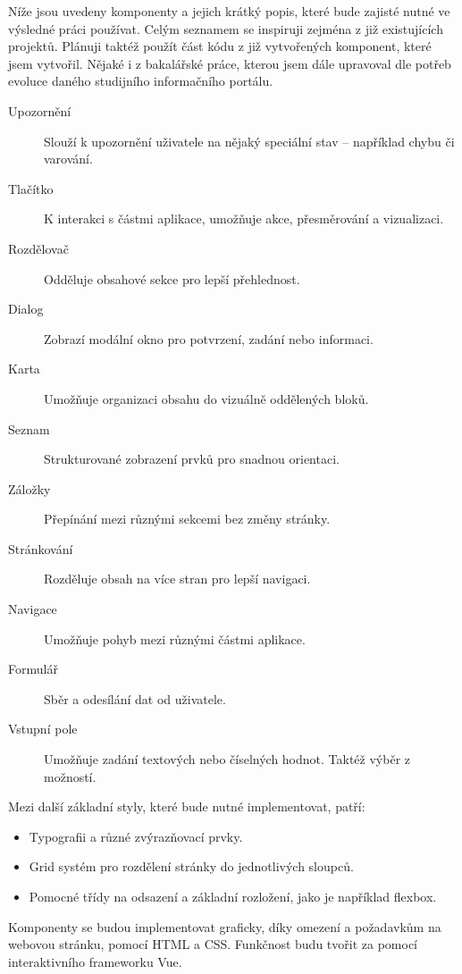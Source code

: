 Níže jsou uvedeny komponenty a jejich krátký popis, které bude zajisté nutné ve výsledné práci používat.
Celým seznamem se inspiruji zejména z již existujících projektů.
Plánuji taktéž použít část kódu z již vytvořených komponent, které jsem vytvořil.
Nějaké i z bakalářské práce, kterou jsem dále upravoval dle potřeb evoluce daného studijního informačního portálu. 

\begin{description} 
    \item[Upozornění] Slouží k upozornění uživatele na nějaký speciální stav – například chybu či varování. 
    \item[Tlačítko] K interakci s částmi aplikace, umožňuje akce, přesměrování a vizualizaci. 
    \item[Rozdělovač] Odděluje obsahové sekce pro lepší přehlednost. 
    \item[Dialog] Zobrazí modální okno pro potvrzení, zadání nebo informaci. 
    \item[Karta] Umožňuje organizaci obsahu do vizuálně oddělených bloků. 
    \item[Seznam] Strukturované zobrazení prvků pro snadnou orientaci. 
    \item[Záložky] Přepínání mezi různými sekcemi bez změny stránky. 
    \item[Stránkování] Rozděluje obsah na více stran pro lepší navigaci. 
    \item[Navigace] Umožňuje pohyb mezi různými částmi aplikace. 
    \item[Formulář] Sběr a odesílání dat od uživatele. 
    \item[Vstupní pole] Umožňuje zadání textových nebo číselných hodnot. Taktéž výběr z možností.
\end{description}

Mezi další základní styly, které bude nutné implementovat, patří:

\begin{itemize}
    \item Typografii a různé zvýrazňovací prvky.
    \item Grid systém pro rozdělení stránky do jednotlivých sloupců.
    \item Pomocné třídy na odsazení a základní rozložení, jako je například flexbox.
\end{itemize}

Komponenty se budou implementovat graficky, díky omezení a požadavkům na webovou stránku, pomocí HTML a CSS.
Funkčnost budu tvořit za pomocí interaktivního frameworku Vue.

